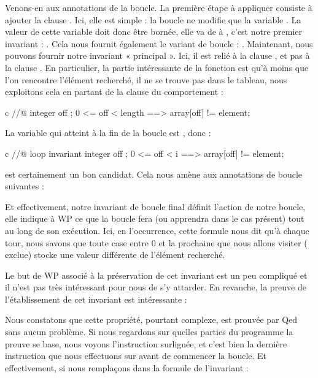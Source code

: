 Venons-en aux annotations de la boucle. La première étape à appliquer consiste à ajouter la
clause . Ici, elle est simple : la boucle ne modifie que la
variable . La valeur de cette variable doit donc être bornée, elle
va de  à , c'est notre premier invariant :
. Cela nous fournit également le variant de boucle :
. Maintenant, nous pouvons fournir notre invariant
« principal ». Ici, il est relié à la clause , et pas à la
clause . En particulier, la partie intéressante de la
fonction est qu'à moins que l'on rencontre l'élément recherché, il ne se trouve
pas dans le tableau, nous exploitons cela en partant de la clause
 du comportement  :
\begin{CodeBlock}{c}
  //@ \forall integer off ; 0 <= off < length ==> array[off] != element;
\end{CodeBlock}
La variable qui atteint  à la fin de la boucle est
, donc :
\begin{CodeBlock}{c}
  //@ loop invariant \forall integer off ; 0 <= off < i ==> array[off] != element;
\end{CodeBlock}
est certainement un bon candidat. Cela nous amène aux annotations de boucle
suivantes :




Et effectivement, notre invariant de boucle final définit l'action de notre
boucle, elle indique à WP ce que la boucle fera (ou apprendra dans le cas
présent) tout au long de son exécution. Ici, en l'occurrence, cette formule nous
dit qu'à chaque tour, nous savons que toute case entre 0 et la prochaine que
nous allons visiter ( exclue) stocke une valeur différente de
l'élément recherché.


Le but de WP associé à la préservation de cet invariant est un peu compliqué et
il n'est pas très intéressant pour nous de s'y attarder. En revanche, la
preuve de l'établissement de cet invariant est intéressante :




Nous constatons que cette propriété, pourtant complexe, est prouvée par
Qed sans aucun problème. Si nous regardons sur quelles parties du programme la
preuve se base, nous voyons l'instruction  surlignée, et c'est
bien la dernière instruction que nous effectuons sur  avant de commencer
la boucle. Et effectivement, si nous remplaçons  dans la formule
de l'invariant :


